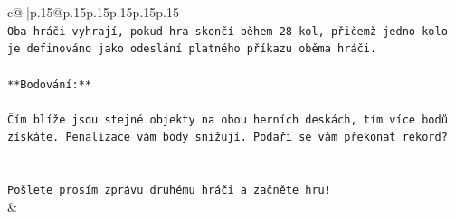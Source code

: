 \documentclass{article}
\begin{document}
{\begin{supertabular}{c@{$\;$}|p{.15\linewidth}@{}p{.15\linewidth}p{.15\linewidth}p{.15\linewidth}p{.15\linewidth}p{.15\linewidth}}
{{{\\ 
\texttt{Oba hráči vyhrají, pokud hra skončí během 28 kol, přičemž jedno kolo je definováno jako odeslání platného příkazu oběma hráči.} \\
\\ 
\texttt{**Bodování:**} \\
\\ 
\texttt{Čím blíže jsou stejné objekty na obou herních deskách, tím více bodů získáte. Penalizace vám body snižují. Podaří se vám překonat rekord?} \\
\\ 
\\ 
\texttt{Pošlete prosím zprávu druhému hráči a začněte hru!} \\
            }
        }
    }
    & \\ \\


\end{supertabular}}
\end{document}
